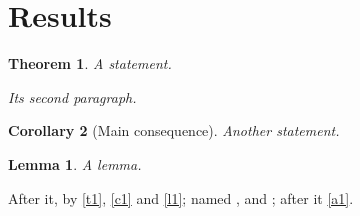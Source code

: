 \documentclass{article}
\newtheorem{theorem}{Theorem}
\newtheorem{corollary}[theorem]{Corollary}
\newtheorem{lemma}{Lemma}
\begin{document}
\section{Results}
\begin{theorem}\label{t1}
A statement.

Its second paragraph.
\end{theorem}
\begin{corollary}[Main consequence]\label{c1}
Another statement.
\end{corollary}
\begin{lemma}\label{l1}
A lemma.
\end{lemma}
After it\label{a1}, by \autoref{t1}, \autoref{c1} and \autoref{l1}; named ,  and ; after it \autoref{a1}.
\end{document}
